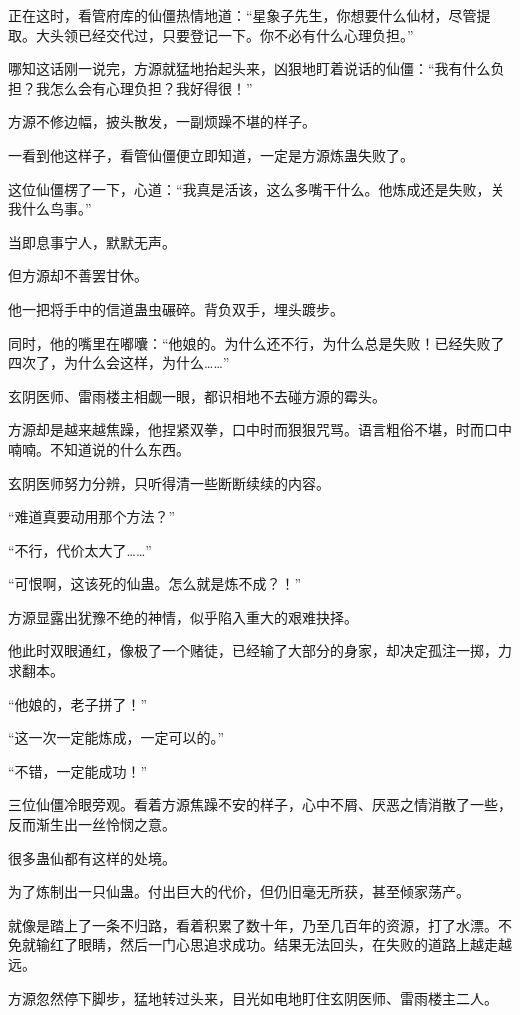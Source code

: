 \begin{this_body}
正在这时，看管府库的仙僵热情地道：“星象子先生，你想要什么仙材，尽管提取。大头领已经交代过，只要登记一下。你不必有什么心理负担。”

哪知这话刚一说完，方源就猛地抬起头来，凶狠地盯着说话的仙僵：“我有什么负担？我怎么会有心理负担？我好得很！”

方源不修边幅，披头散发，一副烦躁不堪的样子。

一看到他这样子，看管仙僵便立即知道，一定是方源炼蛊失败了。

这位仙僵楞了一下，心道：“我真是活该，这么多嘴干什么。他炼成还是失败，关我什么鸟事。”

当即息事宁人，默默无声。

但方源却不善罢甘休。

他一把将手中的信道蛊虫碾碎。背负双手，埋头踱步。

同时，他的嘴里在嘟囔：“他娘的。为什么还不行，为什么总是失败！已经失败了四次了，为什么会这样，为什么……”

玄阴医师、雷雨楼主相觑一眼，都识相地不去碰方源的霉头。

方源却是越来越焦躁，他捏紧双拳，口中时而狠狠咒骂。语言粗俗不堪，时而口中喃喃。不知道说的什么东西。

玄阴医师努力分辨，只听得清一些断断续续的内容。

“难道真要动用那个方法？”

“不行，代价太大了……”

“可恨啊，这该死的仙蛊。怎么就是炼不成？！”

方源显露出犹豫不绝的神情，似乎陷入重大的艰难抉择。

他此时双眼通红，像极了一个赌徒，已经输了大部分的身家，却决定孤注一掷，力求翻本。

“他娘的，老子拼了！”

“这一次一定能炼成，一定可以的。”

“不错，一定能成功！”

三位仙僵冷眼旁观。看着方源焦躁不安的样子，心中不屑、厌恶之情消散了一些，反而渐生出一丝怜悯之意。

很多蛊仙都有这样的处境。

为了炼制出一只仙蛊。付出巨大的代价，但仍旧毫无所获，甚至倾家荡产。

就像是踏上了一条不归路，看着积累了数十年，乃至几百年的资源，打了水漂。不免就输红了眼睛，然后一门心思追求成功。结果无法回头，在失败的道路上越走越远。

方源忽然停下脚步，猛地转过头来，目光如电地盯住玄阴医师、雷雨楼主二人。


\end{this_body}
